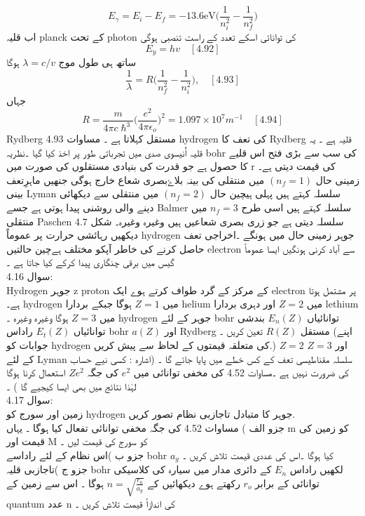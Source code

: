 \documentclass{book}
\begin{document}
\[E_{\gamma}=E_{i}-E_{f}=-13.6\text{eV}\big(\frac{1}{n^{2}_{i}}-\frac{1}{n^{2}_{f}}\big)\]
اب قلیہ planck کے تحت photon کی توانائی اسکے تعدد کے راست تنصبی ہوگی 
\[E_{y}=hv\quad[4.92]\]
ساتھ ہی طول موج
\(\lambda=c/v\)
ہوگا
\[\frac{1}{\lambda}=R\big(\frac{1}{n^{2}_{f}}-\frac{1}{n^{2}_{i}}\big),\quad[4.93]\]
جہاں 
\[R=\frac{m}{4\pi{c}\hslash^{3}}\big(\frac{e^{2}}{4\pi\epsilon_{o}}\big)^{2}=1.097\times10^{7}m^{-1}\quad[4.94]\]
Rydberg مستقل کہلاتا ہے ۔
مساوات 4.93 hydrogen کی تعف کا Rydberg قلیہ ہے ۔ یہ قلیہ اُنیسوی صدی میں تجرباتی طور پر اخذ کیا گیا ۔نظریہ bohr کی سب سے بڑی فتح اس قلیے کا حصول ہے جو قدرت کی بنیادی مستقلوں کی صورت میں r کی قیمت دیتی ہے۔ زمینی حال
\((n_{f}=1)\)
میں منتقلی کی بینہ بلاۓبصری شعاع خارج ہوگی جنھیں ماہرِتعف بینی Lyman سلسلہ کہتے ہیں پہلی ہیچین حال
\((n_{f}=2)\)
میں منتقلی سے دیکھائی دینے والی روشنی پیدا ہوتی ہے جسے Balmer سلسلہ کہتے ہیں اسی طرح 
\(n_{f}=3\)
میں منتقلی Paschen سلسلہ دیتی ہے جو زری بصری شعاعیں ہیں وغیرہ وغیرہ۔ شکل 4.7 دیکھیں رہائشی حرارت پر عموماً hydrogen جوہر زمینی حال میں ہونگے ۔اخراجی تعف حاصل کرنے کی خاطر آپکو مختلف ہےچین حالتیں  electron سے آباد کرنی ہونگیں ایسا عموماً گیس میں برقی چنگاری پیدا کرکے کیا جاتا ہے ۔\\
سوال 4.16:\\
Hydrogen جوہر z proton کے مرکز کے گرد طواف کرتے ہوے ایک electron پر مشتمل ہوتا ہے۔ hydrogen میں 
\(Z=1\)
ہوگا جبکے بردارا helium میں 
\(Z=2\)
اور دہری بردارا  lethium میں
\(Z=3\)
ہوگا وغیرہ وغیرہ ۔ hydrogen جوہر کے لئے bohr توانائیاں
\(E_{n}(Z)\)
بندشی توانائياں
\(E_{t}(Z)\)
راداس bohr 
\(a(Z)\)
اور Rydberg مستقل 
\(R(Z)\)
تعین کریں ۔ (اپنے جوابات کو hydrogen کی متعلقہ قیمتوں کے لحاظ سے پیش کریں.)
\(Z=2\)
اور 
\(Z=3\)
کے لئے Lyman سلسلہ مقناطیسی تعف کے کس خطے میں پایا جائے گا ۔ (اشارہ : کسی نیے حساب کی ضرورت نہیں ہے ۔مساوات 4.52 کی مخفی توانائی میں 
\(e^{2}\)
کی جگہ 
\(Ze^{2}\)
استعمال کرنا ہوگا لہٰذا نتائج میں بھی ایسا کیجیے گا ) ۔\\
سوال 4.17:\\
زمین اور سورج کو hydrogen جوہر کا متبادل تاجازبی نظام تصور کریں.\\
جزو الف ) مساوات 4.52 کی جگہ مخفی توانائی تفعال کیا ہوگا ۔ یہاں m کو زمین کی قیمت اور M کو سورج کی قیمت لیں ۔\\
جزو ب )اس نظام کے لئے راداسے bohr 
\(a_{g}\)
کیا ہوگا ۔اس کی عددی قیمت تلاش کریں ۔\\
جزو ج )تاجازبی قلیہ bohr لکھیں راداس 
\(E_{n}\)
کے دائری مدار میں سیارہ کی كلاسیكی توانائی کے برابر
\(r_{o}\)
رکھتے ہوے دیکھائیں کے 
\(n=\sqrt{\frac{r_{0}}{a_{g}}}\)
ہوگا ۔ اس سے زمین کے quantum عدد n کی اندازاً قیمت تلاش کریں ۔\\
\end{document}
